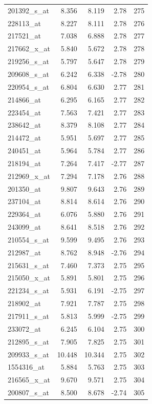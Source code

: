 \begin{footnotesize}
\begin{longtable}{lrrrr}
201392\_s\_at & 8.356 & 8.119 & 2.78 & 275 \\
228113\_at & 8.227 & 8.111 & 2.78 & 276 \\
217521\_at & 7.038 & 6.888 & 2.78 & 277 \\
217662\_x\_at & 5.840 & 5.672 & 2.78 & 278 \\
219256\_s\_at & 5.797 & 5.647 & 2.78 & 279 \\
209608\_s\_at & 6.242 & 6.338 & -2.78 & 280 \\
220954\_s\_at & 6.804 & 6.630 & 2.77 & 281 \\
214866\_at & 6.295 & 6.165 & 2.77 & 282 \\
223454\_at & 7.563 & 7.421 & 2.77 & 283 \\
238642\_at & 8.379 & 8.108 & 2.77 & 284 \\
214472\_at & 5.951 & 5.697 & 2.77 & 285 \\
240451\_at & 5.964 & 5.784 & 2.77 & 286 \\
218194\_at & 7.264 & 7.417 & -2.77 & 287 \\
212969\_x\_at & 7.294 & 7.178 & 2.76 & 288 \\
201350\_at & 9.807 & 9.643 & 2.76 & 289 \\
237104\_at & 8.814 & 8.614 & 2.76 & 290 \\
229364\_at & 6.076 & 5.880 & 2.76 & 291 \\
243099\_at & 8.641 & 8.518 & 2.76 & 292 \\
210554\_s\_at & 9.599 & 9.495 & 2.76 & 293 \\
212987\_at & 8.762 & 8.948 & -2.76 & 294 \\
215631\_s\_at & 7.460 & 7.373 & 2.75 & 295 \\
215050\_x\_at & 5.891 & 5.801 & 2.75 & 296 \\
221234\_s\_at & 5.931 & 6.191 & -2.75 & 297 \\
218902\_at & 7.921 & 7.787 & 2.75 & 298 \\
217911\_s\_at & 5.813 & 5.999 & -2.75 & 299 \\
233072\_at & 6.245 & 6.104 & 2.75 & 300 \\
212895\_s\_at & 7.905 & 7.825 & 2.75 & 301 \\
209933\_s\_at & 10.448 & 10.344 & 2.75 & 302 \\
1554316\_at & 5.884 & 5.763 & 2.75 & 303 \\
216565\_x\_at & 9.670 & 9.571 & 2.75 & 304 \\
200807\_s\_at & 8.500 & 8.678 & -2.74 & 305 \\

\end{longtable}
\end{footnotesize}
